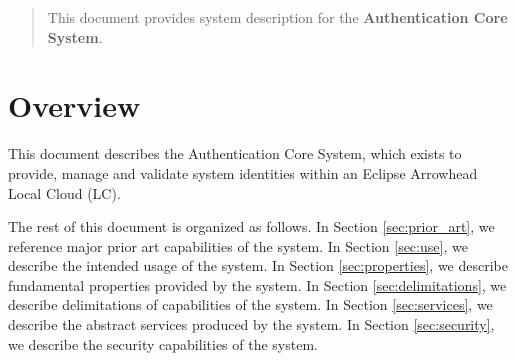 \documentclass[a4paper]{arrowhead}
\begin{document}
\ArrowheadDate{\today}
\ArrowheadSetup

\begin{center}
  \vspace*{1cm}
  \huge{\arrowtitle}

  \vspace*{0.2cm}
  \LARGE{\arrowtype}
  \vspace*{1cm}

  \vspace*{\fill}


  \vspace*{1cm}
  \vspace*{\fill}

  \begin{abstract}
    This document provides system description for the \textbf{Authentication Core System}.
  \end{abstract}

  \vspace*{1cm}

 \end{center}

\newpage

\tableofcontents
\newpage

\section{Overview}
\label{sec:overview}
\color{black}
This document describes the Authentication Core System, which exists to provide, manage and validate system identities within an Eclipse Arrowhead Local Cloud (LC).

The rest of this document is organized as follows.
In Section \ref{sec:prior_art}, we reference major prior art capabilities
of the system.
In Section \ref{sec:use}, we describe the intended usage of the system.
In Section \ref{sec:properties}, we describe fundamental properties
provided by the system.
In Section \ref{sec:delimitations}, we describe delimitations of capabilities
of the system.
In Section \ref{sec:services}, we describe the abstract services produced by the system.
In Section \ref{sec:security}, we describe the security capabilities
of the system.
\end{document}
